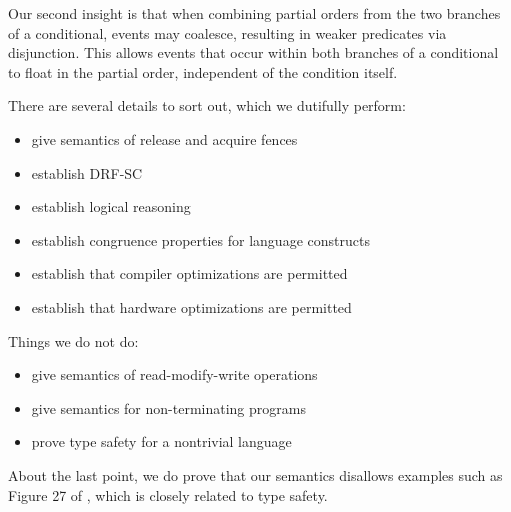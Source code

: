 Our second insight is that when combining partial orders from the two
branches of a conditional, events may coalesce, resulting in weaker
predicates via disjunction.  This allows events that occur within both
branches of a conditional to float in the partial order, independent of the
condition itself.

There are several details to sort out, which we dutifully perform:
\begin{itemize}
\item give semantics of release and acquire fences
\item establish DRF-SC
\item establish logical reasoning
\item establish congruence properties for language constructs
\item establish that compiler optimizations are permitted
\item establish that hardware optimizations are permitted
\end{itemize}

Things we do not do:
\begin{itemize}
\item give semantics of read-modify-write operations
\item give semantics for non-terminating programs
\item prove type safety for a nontrivial language
\end{itemize}
About the last point, we do prove that our semantics disallows examples such
as Figure 27 of \cite{DBLP:journals/toplas/Lochbihler13}, which is closely
related to type safety.



